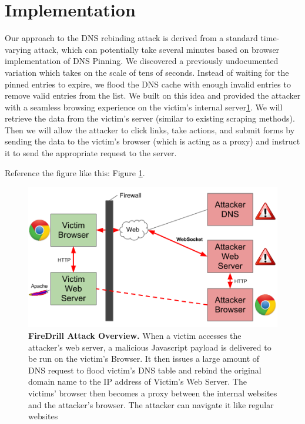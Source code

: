 \section{Implementation}
\label{sec:impl}
Our approach to the DNS rebinding attack is derived from a standard time-varying attack, which can potentially take several minutes based on browser implementation of DNS Pinning. We discovered a previously undocumented variation which takes on the scale of tens of seconds. Instead of waiting for the pinned entries to expire, we flood the DNS cache with enough invalid entries to remove valid entries from the list. We built on this idea and provided the attacker with a seamless browsing experience on the victim's internal server\ref{fig:firedrill1}. We will retrieve the data from the victim's server (similar to existing scraping methods). Then we will allow the attacker to click links, take actions, and submit forms by sending the data to the victim's browser (which is acting as a proxy) and instruct it to send the appropriate request to the server.

Reference the figure like this: Figure \ref{fig:firedrill1}.

\begin{figure}[h]
\centering
\includegraphics[width=0.8\columnwidth]{firedrill1.png}
\caption{\textbf{FireDrill Attack Overview.} When a victim accesses the attacker's web server, a malicious Javascript payload is delivered to be run on the victim's Browser. It then issues a large amount of DNS request to flood victim's DNS table and rebind the original domain name to the IP address of Victim's Web Server. The victims' browser then becomes a proxy between the internal websites and the attacker's browser. The attacker can navigate it like regular websites}
\label{fig:firedrill1}
\end{figure}

